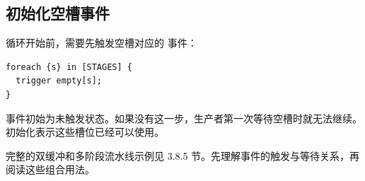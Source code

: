 \subsection*{初始化空槽事件}

循环开始前，需要先触发空槽对应的 \co@empty@ 事件：

\begin{lstlisting}[language=croqtile,caption={引导协议}]
foreach {s} in [STAGES] {
  trigger empty[s];
}
\end{lstlisting}

事件初始为未触发状态。如果没有这一步，生产者第一次等待空槽时就无法继续。初始化表示这些槽位已经可以使用。

完整的双缓冲和多阶段流水线示例见 3.8.5 节。先理解事件的触发与等待关系，再阅读这些组合用法。
